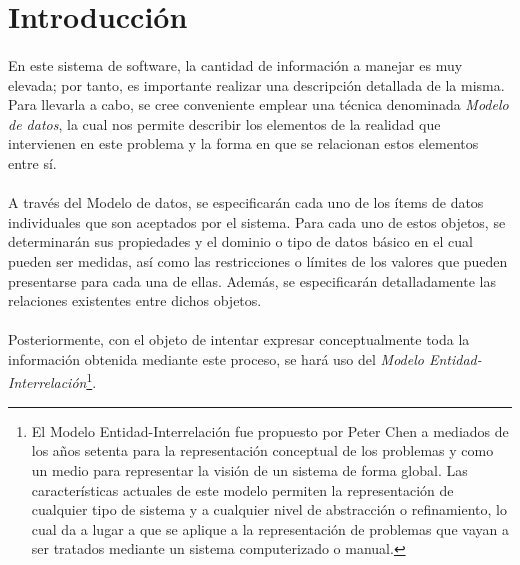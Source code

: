 \section{Introducción}

   \paragraph{}En este sistema de software, la cantidad de información a manejar
   es muy elevada; por tanto, es importante realizar una descripción detallada
   de la misma. Para llevarla a cabo, se cree conveniente emplear una técnica
   denominada \textit{Modelo de datos}, la cual nos permite describir los
   elementos de la realidad que intervienen en este problema y la forma en que
   se relacionan estos elementos entre sí.

   \paragraph{}A través del Modelo de datos, se especificarán cada uno de los
   ítems de datos individuales que son aceptados por el sistema. Para cada uno
   de estos objetos, se determinarán sus propiedades y el dominio o tipo de
   datos básico en el cual pueden ser medidas, así como las restricciones o
   límites de los valores que pueden presentarse para cada una de ellas.
   Además, se especificarán detalladamente las relaciones existentes entre
   dichos objetos.

   \paragraph{}Posteriormente, con el objeto de intentar expresar
   conceptualmente toda la información obtenida mediante este proceso, se hará
   uso del \textit{Modelo Entidad-Interrelación}\footnote{El Modelo
   Entidad-Interrelación fue propuesto por Peter Chen\cite{peterChen} a mediados
   de los años setenta para la representación conceptual de los problemas y como
   un medio para representar la visión de un sistema de forma global. Las
   características actuales de este modelo permiten la representación de
   cualquier tipo de sistema y a cualquier nivel de abstracción o refinamiento,
   lo cual da a lugar a que se aplique a la representación de problemas que
   vayan a ser tratados mediante un sistema computerizado o manual.}.

